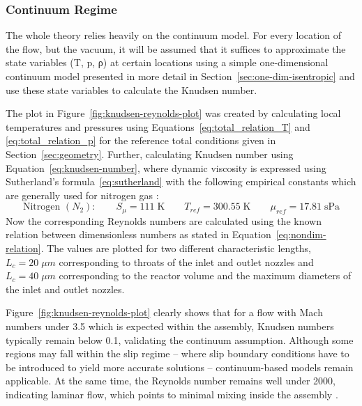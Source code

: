 \subsubsection*{Continuum Regime}
	The whole theory relies heavily on the continuum model.
	For every location of the flow, but the vacuum, it will be assumed that it suffices to approximate the state variables (T, p, ρ) at certain locations using a simple one-dimensional continuum model presented in more detail in Section~\ref{sec:one-dim-isentropic} and use these state variables to calculate the Knudsen number.

	The plot in Figure~\ref{fig:knudsen-reynolds-plot} was created by calculating local temperatures and pressures using Equations~\eqref{eq:total_relation_T} and \eqref{eq:total_relation_p} for the reference total conditions given in Section~\ref{sec:geometry}.
	Further, calculating Knudsen number using Equation~\eqref{eq:knudsen-number}, where dynamic viscosity is expressed using Sutherland's formula~\eqref{eq:sutherland} with the following empirical constants which are generally used for nitrogen gas \cite{kim2004numericalanalysisflowcharacteristics}:
	$$
		\text{Nitrogen }(N_2):
			\qquad
		S_\mu = 111\;\text{K}
			\qquad
		T_{ref} = 300.55\;\text{K}
			\qquad
		\mu_{ref} = 17.81\; \text{sPa}
	$$
	Now the corresponding Reynolds numbers are calculated using the known relation between dimensionless numbers as stated in Equation~\eqref{eq:nondim-relation}.
	The values are plotted for two different characteristic lengths, $L_c = 20\;\mu m$ corresponding to throats of the inlet and outlet nozzles and $L_c = 40\;\mu m$ corresponding to the reactor volume and the maximum diameters of the inlet and outlet nozzles.

	Figure~\ref{fig:knudsen-reynolds-plot} clearly shows that for a flow with Mach numbers under 3.5 which is expected within the assembly, Knudsen numbers typically remain below 0.1, validating the continuum assumption.
	Although some regions may fall within the slip regime -- where slip boundary conditions have to be introduced to yield more accurate solutions -- continuum-based models remain applicable. 
	At the same time, the Reynolds number remains well under 2000, indicating laminar flow, which points to minimal mixing inside the assembly \cite{ames1953compressible, comsol_microfluidics_guide}.

